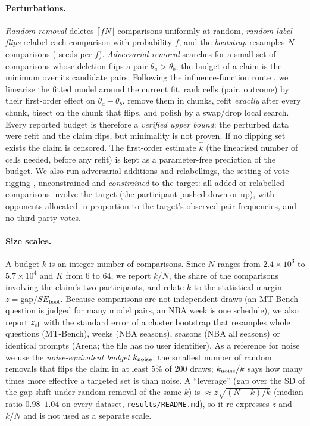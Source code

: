 \documentclass{article}
\begin{document}
\paragraph{Perturbations.} \emph{Random removal} deletes $\lceil fN\rfloor$ comparisons uniformly at random, \emph{random label flips} relabel each comparison with probability $f$, and the \emph{bootstrap} resamples $N$ comparisons (\nSeeds{} seeds per $f$). \emph{Adversarial removal} searches for a small set of comparisons whose deletion flips a pair $\theta_a>\theta_b$; the budget of a claim is the minimum over its candidate pairs. Following the influence-function route \citep{koh2017influence,broderick2020automatic}, we linearise the fitted model around the current fit, rank cells (pair, outcome) by their first-order effect on $\theta_a-\theta_b$, remove them in chunks, refit \emph{exactly} after every chunk, bisect on the chunk that flips, and polish by a swap/drop local search. Every reported budget is therefore a \emph{verified upper bound}: the perturbed data were refit and the claim flips, but minimality is not proven. If no flipping set exists the claim is censored. The first-order estimate $\hat k$ (the linearised number of cells needed, before any refit) is kept as a parameter-free prediction of the budget. We also run adversarial additions and relabellings, the setting of vote rigging \citep{min2025rigging}, unconstrained and \emph{constrained} to the target: all added or relabelled comparisons involve the target (the participant pushed down or up), with opponents allocated in proportion to the target's observed pair frequencies, and no third-party votes.

\paragraph{Size scales.} A budget $k$ is an integer number of comparisons. Since $N$ ranges from $2.4\times10^3$ to $5.7\times10^4$ and $K$ from 6 to 64, we report $k/N$, the share of the comparisons involving the claim's two participants, and relate $k$ to the statistical margin $z=\text{gap}/SE_{\text{boot}}$. Because comparisons are not independent draws (an MT-Bench question is judged for many model pairs, an NBA week is one schedule), we also report $z_{\rm cl}$ with the standard error of a cluster bootstrap that resamples whole questions (MT-Bench), weeks (NBA seasons), seasons (NBA all seasons) or identical prompts (Arena; the file has no user identifier). As a reference for noise we use the \emph{noise-equivalent budget} $k_{\rm noise}$: the smallest number of random removals that flips the claim in at least 5\% of 200 draws; $k_{\rm noise}/k$ says how many times more effective a targeted set is than noise. A ``leverage'' (gap over the SD of the gap shift under random removal of the same $k$) is $\approx z\sqrt{(N-k)/k}$ (median ratio $0.98$--$1.04$ on every dataset, \texttt{results/README.md}), so it re-expresses $z$ and $k/N$ and is not used as a separate scale.
\end{document}
